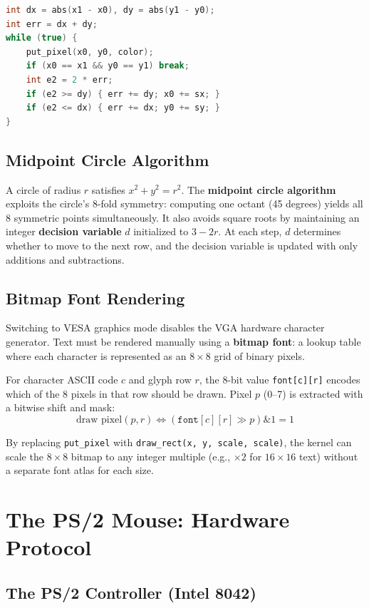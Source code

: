 \documentclass[12pt,a4paper]{report}
\begin{document}
\begin{lstlisting}[language=C++]
int dx = abs(x1 - x0), dy = abs(y1 - y0);
int err = dx + dy;
while (true) {
    put_pixel(x0, y0, color);
    if (x0 == x1 && y0 == y1) break;
    int e2 = 2 * err;
    if (e2 >= dy) { err += dy; x0 += sx; }
    if (e2 <= dx) { err += dx; y0 += sy; }
}
\end{lstlisting}

\subsection{Midpoint Circle Algorithm}

A circle of radius $r$ satisfies $x^2 + y^2 = r^2$. The \textbf{midpoint circle
algorithm} exploits the circle's 8-fold symmetry: computing one octant (45 degrees)
yields all 8 symmetric points simultaneously. It also avoids square roots by
maintaining an integer \textbf{decision variable} $d$ initialized to $3 - 2r$. At
each step, $d$ determines whether to move to the next row, and the decision variable
is updated with only additions and subtractions.

\subsection{Bitmap Font Rendering}

Switching to VESA graphics mode disables the VGA hardware character generator.
Text must be rendered manually using a \textbf{bitmap font}: a lookup table where
each character is represented as an $8 \times 8$ grid of binary pixels.

For character ASCII code $c$ and glyph row $r$, the 8-bit value \texttt{font[c][r]}
encodes which of the 8 pixels in that row should be drawn. Pixel $p$ (0--7) is
extracted with a bitwise shift and mask:
\[
\text{draw pixel}(p, r) \iff \left(\texttt{font}[c][r] \gg p\right) \mathbin{\&} 1 = 1
\]

By replacing \texttt{put\_pixel} with \texttt{draw\_rect(x, y, scale, scale)}, the
kernel can scale the $8 \times 8$ bitmap to any integer multiple (e.g., $\times 2$
for $16 \times 16$ text) without a separate font atlas for each size.

\section{The PS/2 Mouse: Hardware Protocol}

\subsection{The PS/2 Controller (Intel 8042)}
\end{document}
